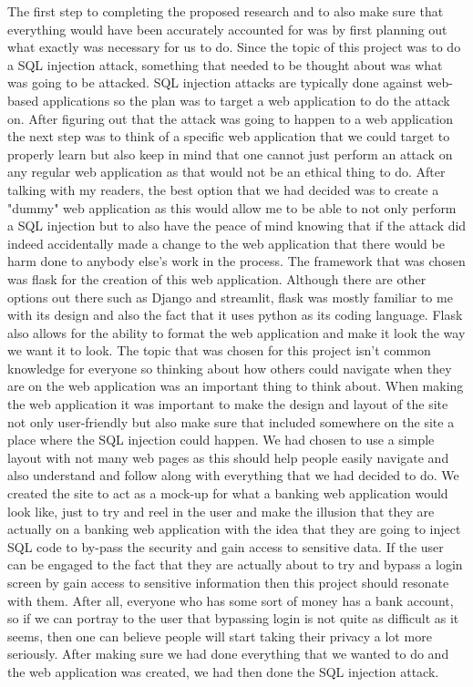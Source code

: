 The first step to completing the proposed research and to also make sure that everything
would have been accurately accounted for was by first planning out what exactly was necessary
for us to do. Since the topic of this project was to do a SQL injection attack, something that needed to be thought about was what was going to be attacked. SQL injection attacks are typically done against
web-based applications so the plan was to target a web application to do the attack on. After
figuring out that the attack was going to happen to a web application the next step was to think of a specific web application that we could target to properly learn but also
keep in mind that one cannot just perform an attack on any regular web application as that would
not be an ethical thing to do. After talking with my readers, the best option that
we had decided was to create a "dummy" web application as this would allow
me to be able to not only perform a SQL injection but to also have the peace of
mind knowing that if the attack did indeed accidentally made a change to the web application that
there would be harm done to anybody else's work in the process. The framework that was chosen was flask for the creation of this web application. Although there are other options out there
such as Django and streamlit, flask was mostly familiar to me with its design
and also the fact that it uses python as its coding language. Flask also allows for the ability to format the web application and make it look the way we want it to look. The topic
that was chosen for this project isn't common knowledge for everyone so thinking about how others
could navigate when they are on the web application was an important thing to think about. When making the web application it was important to make
the design and layout of the site not only user-friendly but also make sure that
included somewhere on the site a place where the SQL injection could happen. We had chosen
to use a simple layout with not many web pages as this should help people easily
navigate and also understand and follow along with everything that we had decided
to do. We created the site to act as a mock-up for what a banking web application would look like, just to
try and reel in the user and make the illusion that they are actually on a banking
web application with the idea that they are going to inject SQL code to by-pass the
security and gain access to sensitive data. If the user can be engaged to
the fact that they are actually about to try and bypass a login screen by gain access to sensitive information then this project should resonate with them. After all,
everyone who has some sort of money has a bank account, so if we can portray to the user that bypassing login is not quite as difficult as it seems, then
one can believe people will start taking their privacy a lot more seriously. After making
sure we had done everything that we wanted to do and the web application was created, we had
then done the SQL injection attack.


